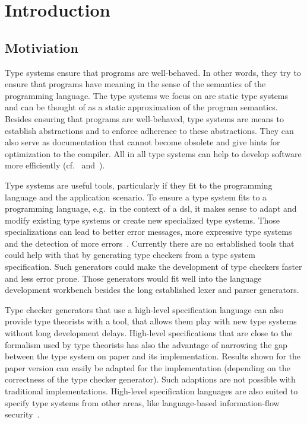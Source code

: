 \chapter{Introduction}
\section{Motiviation}
Type systems ensure that programs are well-behaved. In other words,
they try to ensure that programs have meaning in the sense of the
semantics of the programming language. The type systems we focus on
are static type systems and can be thought of as a static
approximation of the program semantics. Besides ensuring that programs
are well-behaved, type systems are means to establish abstractions and
to enforce adherence to these abstractions. They can also serve as
documentation that cannot become obsolete and give hints for
optimization to the compiler. All in all type systems can help to
develop software more efficiently
(cf.~\cite{Petersen:2014:ECS:2597008.2597152}
and~\cite{Mayer:2012:ESI:2384616.2384666}).

Type systems are useful tools, particularly if they fit to the
programming language and the application scenario. To ensure a type
system fits to a programming language, e.g.\ in the context of a
\gls{dsl}, it makes sense to adapt and modify existing type systems or
create new specialized type systems. Those specializations can lead to
better error messages, more expressive type systems and the detection
of more errors~\cite{Thiemann02programmabletype}. Currently there are
no established tools that could help with that by generating type
checkers from a type system specification. Such generators could make
the development of type checkers faster and less error prone. Those
generators would fit well into the language development workbench
besides the long established lexer and parser generators.

Type checker generators that use a high-level specification language
can also provide type theorists with a tool, that allows them play
with new type systems without long development delays. High-level
specifications that are close to the formalism used by type theorists
has also the advantage of narrowing the gap between the type system on
paper and its implementation. Results shown for the paper version can
easily be adapted for the implementation (depending on the correctness
of the type checker generator). Such adaptions are not possible with
traditional implementations. High-level specification languages are
also suited to specify type systems from other areas, like
language-based information-flow
security~\cite{Sabelfeld:2006:LIS:2312191.2314769}.

